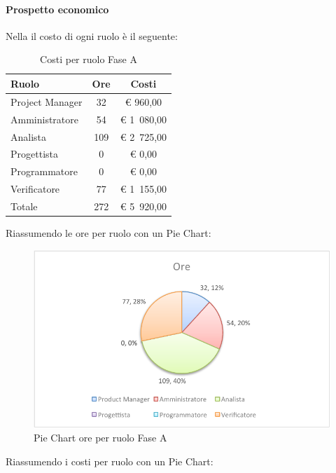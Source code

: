 			\paragraph{Prospetto economico}
				Nella  il costo di ogni ruolo è il seguente:
				\begin{table}[H]
					\begin{center}
						\begin{tabular}{| l | c | c |}
							\hline
							Ruolo 			& Ore 	& Costi  \\ \hline
							
							Project Manager	& 32 		& \euro{} 960,00 	\\
							Amministratore 		& 54 		& \euro{} 1~080,00 	\\
							Analista	 		& 109 	& \euro{} 2~725,00 	\\
							Progettista 		& 0		& \euro{} 0,00 	\\
							Programmatore		& 0		& \euro{} 0,00	\\
							Verificatore		& 77 		& \euro{} 1~155,00 	\\ \hline \hline
							
							Totale	 		& 272 	& \euro{} 5~920,00 	\\ \hline
						\end{tabular}
					\end{center}
					\caption{Costi per ruolo Fase A}
				\end{table}
				Riassumendo le ore per ruolo con un Pie Chart:
				\begin{figure}[H]\centering
					\includegraphics[width=\textwidth]{PianoDiProgetto/Pics/ChartTotOreFaseA.pdf}
					\caption{Pie Chart ore per ruolo Fase A}
				\end{figure}
				Riassumendo i costi per ruolo con un Pie Chart:
